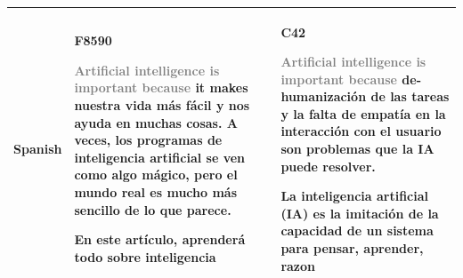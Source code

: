 \begin{tabular}{@{}p{}p{}p{}@{}}
  Spanish & \textbf{F8590}\par \textcolor{gray}{Artificial intelligence is important because} it makes nuestra vida más fácil y nos ayuda en muchas cosas. A veces, los programas de inteligencia artificial se ven como algo mágico, pero el mundo real es mucho más sencillo de lo que parece.\par \par En este artículo, aprenderá todo sobre inteligencia & \textbf{C42}\par \textcolor{gray}{Artificial intelligence is important because} de-humanización de las tareas y la falta de empatía en la interacción con el usuario son problemas que la IA puede resolver.\par \par La inteligencia artificial (IA) es la imitación de la capacidad de un sistema para pensar, aprender, razon \\[3pt]
  \bottomrule
\end{tabular}
